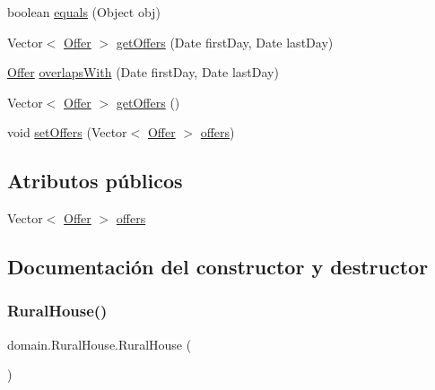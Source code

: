\begin{DoxyCompactItemize}
\item 
boolean \mbox{\hyperlink{classdomain_1_1_rural_house_a92f3f1fa5d605f34e95f4e4175ef2629}{equals}} (Object obj)
\item 
Vector$<$ \mbox{\hyperlink{classdomain_1_1_offer}{Offer}} $>$ \mbox{\hyperlink{classdomain_1_1_rural_house_abe770c8a0fbcfed83a358d84bacd66f7}{get\+Offers}} (Date first\+Day, Date last\+Day)
\item 
\mbox{\hyperlink{classdomain_1_1_offer}{Offer}} \mbox{\hyperlink{classdomain_1_1_rural_house_ac5596b06728d8bf377993088520fbc9e}{overlaps\+With}} (Date first\+Day, Date last\+Day)
\item 
Vector$<$ \mbox{\hyperlink{classdomain_1_1_offer}{Offer}} $>$ \mbox{\hyperlink{classdomain_1_1_rural_house_ae653409c7556fa8b3ccabd0c17604666}{get\+Offers}} ()
\item 
void \mbox{\hyperlink{classdomain_1_1_rural_house_a64672c1962a8df6e8203f08f898404ba}{set\+Offers}} (Vector$<$ \mbox{\hyperlink{classdomain_1_1_offer}{Offer}} $>$ \mbox{\hyperlink{classdomain_1_1_rural_house_a3988c813bc7b8918e515b161bc3cdd20}{offers}})
\end{DoxyCompactItemize}
\subsection*{Atributos públicos}
\begin{DoxyCompactItemize}
\item 
Vector$<$ \mbox{\hyperlink{classdomain_1_1_offer}{Offer}} $>$ \mbox{\hyperlink{classdomain_1_1_rural_house_a3988c813bc7b8918e515b161bc3cdd20}{offers}}
\end{DoxyCompactItemize}


\subsection{Documentación del constructor y destructor}
\mbox{\label{classdomain_1_1_rural_house_a5e1f42ad6b3992bfc5fdece628455552}} 
\subsubsection{\texorpdfstring{RuralHouse()}{RuralHouse()}\hspace{0.1cm}{\footnotesize\ttfamily [1/2]}}
{\footnotesize\ttfamily domain.\+Rural\+House.\+Rural\+House (\begin{DoxyParamCaption}{ }\end{DoxyParamCaption})}

